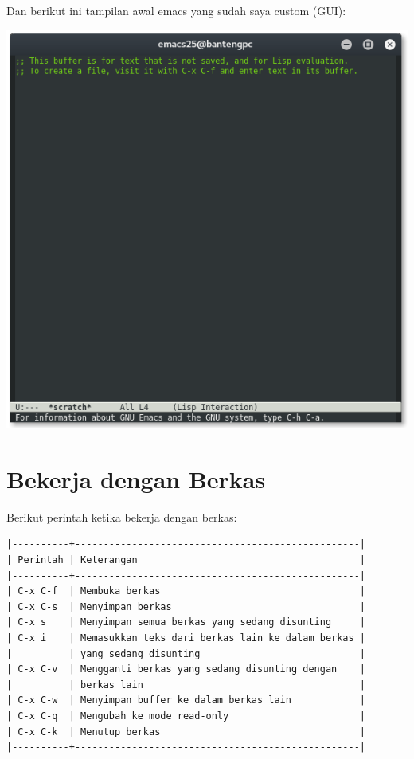 \documentclass{article}
\begin{document}
\vspace{12pt}

Dan berikut ini tampilan awal emacs yang sudah saya custom (GUI):

\vspace{12pt}

\includegraphics[scale=0.45]{images/emacs2.png} 

\vspace{12pt}

\section{Bekerja dengan Berkas}
Berikut perintah ketika bekerja dengan berkas:

\begin{verbatim}
|----------+--------------------------------------------------|
| Perintah | Keterangan                                       |
|----------+--------------------------------------------------|
| C-x C-f  | Membuka berkas                                   |
| C-x C-s  | Menyimpan berkas                                 |
| C-x s    | Menyimpan semua berkas yang sedang disunting     |
| C-x i    | Memasukkan teks dari berkas lain ke dalam berkas |
|          | yang sedang disunting                            |
| C-x C-v  | Mengganti berkas yang sedang disunting dengan    |
|          | berkas lain                                      |
| C-x C-w  | Menyimpan buffer ke dalam berkas lain            |
| C-x C-q  | Mengubah ke mode read-only                       |
| C-x C-k  | Menutup berkas                                   |
|----------+--------------------------------------------------|
\end{verbatim}
\end{document}
